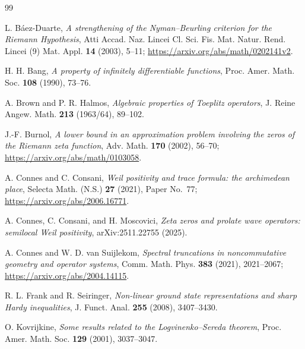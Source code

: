 \documentclass[11pt]{article}
\theoremstyle{remark}
\begin{document}
\begin{thebibliography}{99}

L. B\'aez-Duarte,
\emph{A strengthening of the Nyman--Beurling criterion for the Riemann Hypothesis},
Atti Accad. Naz. Lincei Cl. Sci. Fis. Mat. Natur. Rend. Lincei (9) Mat. Appl. \textbf{14} (2003), 5--11;
\url{https://arxiv.org/abs/math/0202141v2}.

H. H. Bang,
\emph{A property of infinitely differentiable functions},
Proc. Amer. Math. Soc. \textbf{108} (1990), 73--76.

A. Brown and P. R. Halmos,
\emph{Algebraic properties of Toeplitz operators},
J. Reine Angew. Math. \textbf{213} (1963/64), 89--102.

J.-F. Burnol,
\emph{A lower bound in an approximation problem involving the zeros of the Riemann zeta function},
Adv. Math. \textbf{170} (2002), 56--70;
\url{https://arxiv.org/abs/math/0103058}.

A. Connes and C. Consani,
\emph{Weil positivity and trace formula: the archimedean place},
Selecta Math. (N.S.) \textbf{27} (2021), Paper No.~77;
\url{https://arxiv.org/abs/2006.16771}.

A. Connes, C. Consani, and H. Moscovici,
\emph{Zeta zeros and prolate wave operators: semilocal Weil positivity},
arXiv:2511.22755 (2025).

A. Connes and W. D. van Suijlekom,
\emph{Spectral truncations in noncommutative geometry and operator systems},
Comm. Math. Phys. \textbf{383} (2021), 2021--2067;
\url{https://arxiv.org/abs/2004.14115}.

R. L. Frank and R. Seiringer,
\emph{Non-linear ground state representations and sharp Hardy inequalities},
J. Funct. Anal. \textbf{255} (2008), 3407--3430.

O. Kovrijkine,
\emph{Some results related to the Logvinenko--Sereda theorem},
Proc. Amer. Math. Soc. \textbf{129} (2001), 3037--3047.

\end{thebibliography}
\end{document}
